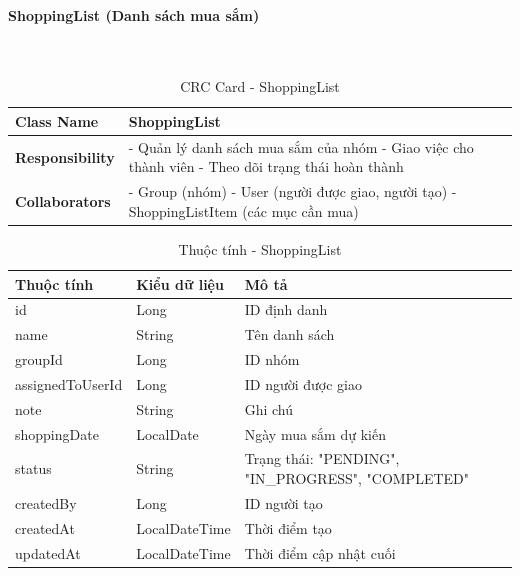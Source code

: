 \paragraph{ShoppingList (Danh sách mua sắm)} ~\\

\begin{table}[H]
\small
\renewcommand{\arraystretch}{1.3}
\begin{tabularx}{\textwidth}{|>{\raggedright\arraybackslash}p{3.5cm}|X|}
\hline
\rowcolor{gray!20}
\textbf{Class Name} & ShoppingList \\
\hline
\textbf{Responsibility} & - Quản lý danh sách mua sắm của nhóm \newline - Giao việc cho thành viên \newline - Theo dõi trạng thái hoàn thành \\
\hline
\textbf{Collaborators} & - Group (nhóm) \newline - User (người được giao, người tạo) \newline - ShoppingListItem (các mục cần mua) \\
\hline
\end{tabularx}
\caption{CRC Card - ShoppingList}
\end{table}

\begin{table}[H]
\small
\renewcommand{\arraystretch}{1.3}
\begin{tabularx}{\textwidth}{|>{\raggedright\arraybackslash}p{3cm}|>{\raggedright\arraybackslash}p{3cm}|X|}
\hline
\rowcolor{gray!20}
\textbf{Thuộc tính} & \textbf{Kiểu dữ liệu} & \textbf{Mô tả} \\
\hline
id & Long & ID định danh \\
\hline
name & String & Tên danh sách \\
\hline
groupId & Long & ID nhóm \\
\hline
assignedToUserId & Long & ID người được giao \\
\hline
note & String & Ghi chú \\
\hline
shoppingDate & LocalDate & Ngày mua sắm dự kiến \\
\hline
status & String & Trạng thái: "PENDING", "IN\_PROGRESS", "COMPLETED" \\
\hline
createdBy & Long & ID người tạo \\
\hline
createdAt & LocalDateTime & Thời điểm tạo \\
\hline
updatedAt & LocalDateTime & Thời điểm cập nhật cuối \\
\hline
\end{tabularx}
\caption{Thuộc tính - ShoppingList}
\end{table}

